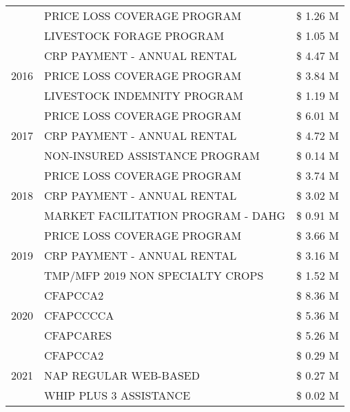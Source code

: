 \begin{tabular}{llr}
 & PRICE LOSS COVERAGE PROGRAM & \$ 1.26 M \\
 & LIVESTOCK FORAGE PROGRAM & \$ 1.05 M \\
\cline{1-3}
\multirow[t]{3}{*}{2016} & CRP PAYMENT - ANNUAL RENTAL & \$ 4.47 M \\
 & PRICE LOSS COVERAGE PROGRAM & \$ 3.84 M \\
 & LIVESTOCK INDEMNITY PROGRAM & \$ 1.19 M \\
\cline{1-3}
\multirow[t]{3}{*}{2017} & PRICE LOSS COVERAGE PROGRAM & \$ 6.01 M \\
 & CRP PAYMENT - ANNUAL RENTAL & \$ 4.72 M \\
 & NON-INSURED ASSISTANCE PROGRAM & \$ 0.14 M \\
\cline{1-3}
\multirow[t]{3}{*}{2018} & PRICE LOSS COVERAGE PROGRAM & \$ 3.74 M \\
 & CRP PAYMENT - ANNUAL RENTAL & \$ 3.02 M \\
 & MARKET FACILITATION PROGRAM - DAHG & \$ 0.91 M \\
\cline{1-3}
\multirow[t]{3}{*}{2019} & PRICE LOSS COVERAGE PROGRAM & \$ 3.66 M \\
 & CRP PAYMENT - ANNUAL RENTAL & \$ 3.16 M \\
 & TMP/MFP 2019 NON SPECIALTY CROPS & \$ 1.52 M \\
\cline{1-3}
\multirow[t]{3}{*}{2020} & CFAPCCA2 & \$ 8.36 M \\
 & CFAPCCCCA & \$ 5.36 M \\
 & CFAPCARES & \$ 5.26 M \\
\cline{1-3}
\multirow[t]{3}{*}{2021} & CFAPCCA2 & \$ 0.29 M \\
 & NAP REGULAR WEB-BASED & \$ 0.27 M \\
 & WHIP PLUS 3 ASSISTANCE & \$ 0.02 M \\
\cline{1-3}
\bottomrule
\end{tabular}
